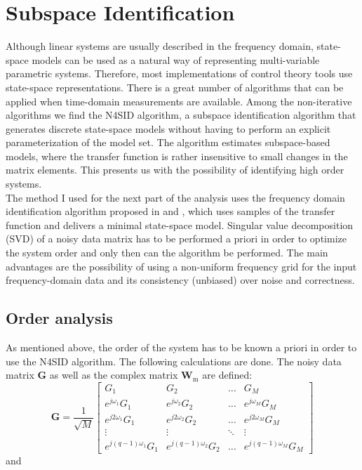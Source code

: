\section{Subspace Identification}

Although linear systems are usually described in the frequency domain, state-space models can be used as a natural way of representing multi-variable parametric systems. Therefore, most implementations of control theory tools use state-space representations. There is a great number of algorithms that can be applied when time-domain measurements are available. Among the non-iterative algorithms we find the N4SID algorithm, a subspace identification algorithm that generates discrete state-space models without having to perform an explicit parameterization of the model set. The algorithm estimates subspace-based models, where the transfer function is rather insensitive to small changes in the matrix elements. This presents us with the possibility of identifying high order systems. \\

The method I used for the next part of the analysis uses the frequency domain identification algorithm proposed in \cite{mckelvey1996subspace} and \cite{van1994n4sid}, which uses samples of the transfer function and delivers a minimal state-space model. Singular value decomposition (SVD) of a noisy data matrix has to be performed a priori in order to optimize the system order and only then can the algorithm be performed. The main advantages are the possibility of using a non-uniform frequency grid for the input frequency-domain data and its consistency (unbiased) over noise and correctness. 


\subsection{Order analysis}

As mentioned above, the order of the system has to be known a priori in order to use the N4SID algorithm. The following calculations are done. The noisy data matrix $\textbf{G}$ as well as the complex matrix $\textbf{W}_\text{m}$ are defined:
\[
\textbf{G} = \frac{1}{\sqrt{M}}
\begin{bmatrix}
G_1 & G_2 & \dots & G_M \\
e^{j\omega_1}G_1 & e^{j\omega_2}G_2 & \dots & e^{j\omega_M}G_M \\
e^{j2\omega_1}G_1 & e^{j2\omega_2}G_2 & \dots & e^{j2\omega_M}G_M \\
\vdots & \vdots & \ddots & \vdots \\
e^{j(q-1)\omega_1}G_1 &e^{j(q-1)\omega_2} G_2 & \dots & e^{j(q-1)\omega_M}G_M 
\end{bmatrix} \]
and

